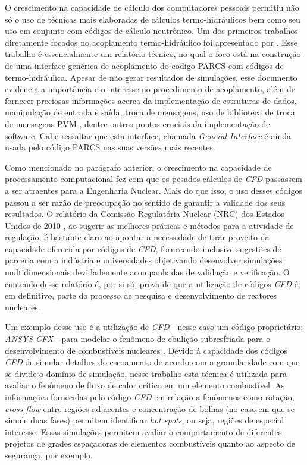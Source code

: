 O crescimento na capacidade de cálculo dos computadores pessoais permitiu não só o uso 
de técnicas mais elaboradas de cálculos termo-hidráulicos bem como seu uso em conjunto 
com códigos de cálculo neutrônico. Um dos primeiros trabalhos diretamente focados no 
acoplamento termo-hidráulico foi apresentado por \cite{Barber98}. Esse trabalho 
é essencialmente um relatório técnico, no qual o foco está na construção de uma interface 
genérica de acoplamento do código PARCS com códigos de termo-hidráulica. Apesar de não 
gerar resultados de simulações, esse documento evidencia a importância e o interesse 
no procedimento de acoplamento, além de fornecer preciosas informações acerca da 
implementação de estruturas de dados, manipulação de entrada e saída, troca de mensagens, 
uso de biblioteca de troca de mensagens PVM \cite{Geist94}, dentre outros pontos cruciais
da implementação de software. Cabe ressaltar que esta interface, 
chamada \textit{General Interface} é ainda usada pelo código PARCS nas suas versões mais 
recentes. 

Como mencionado no parágrafo anterior, o crescimento na capacidade de processamento
computacional 
fez com que os pesados cálculos de \textit{CFD} passassem a ser atraentes 
para a Engenharia Nuclear. Mais do que isso, o uso desses códigos passou a ser razão 
de preocupação no sentido de garantir a validade dos seus resultados. O relatório 
da Comissão Regulatória Nuclear (NRC) dos Estados Unidos de 2010 \cite[p.69]{NUREG2010}, 
ao sugerir as melhores práticas e métodos para a atividade de regulação, é bastante claro 
ao apontar a necessidade de tirar proveito da capacidade oferecida por códigos de \textit{CFD}, 
fornecendo inclusive sugestões de parceria com a indústria e universidades objetivando 
desenvolver simulações multidimensionais devidademente acompanhadas de validação e
verificação. O conteúdo desse relatório é, por si só, prova de que a utilização de 
códigos \textit{CFD} é, em definitivo, parte do processo de 
pesquisa e desenvolvimento de reatores nucleares. 

Um exemplo desse uso é a utilização de \textit{CFD} - nesse caso um código proprietário: 
\textit{ANSYS-CFX} - para modelar o fenômeno de ebulição subresfriada para o 
desenvolvimento de combustíveis nucleares \cite{Krepper2007}. Devido à capacidade 
dos códigos \textit{CFD} de simular detalhes do escoamento de acordo com a granularidade com que se
divide o domínio de simulação, nesse trabalho esta técnica é utilizada para avaliar 
o fenômeno de fluxo de calor crítico em um elemento combustível. As informações 
fornecidas pelo código \textit{CFD} em relação a fenômenos como rotação, \textit{cross flow} entre 
regiões adjacentes e concentração de bolhas (no caso em que se simule duas fases)
permitem identificar \textit{hot spots}, ou seja, regiões de especial interesse.
Essas simulações permitem avaliar o comportamento
de diferentes projetos de grades espaçadoras de elementos combustíveis quanto ao aspecto 
de segurança, por exemplo.

